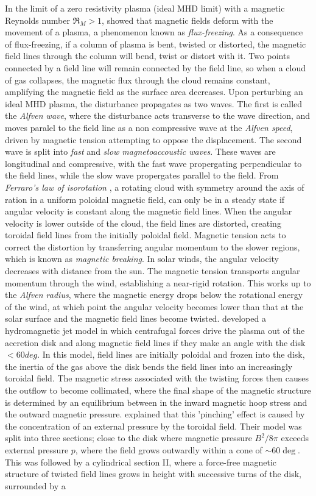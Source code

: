 \documentclass[11pt]{article}
\begin{document}
In the limit of a zero resistivity plasma (ideal MHD limit) with a magnetic Reynolds number $\Re_{M}>1$, \cite{Alfven1942} showed that magnetic fields deform with the movement of a plasma, a phenomenon known as \emph{flux-freezing}. As a consequence of flux-freezing, if a column of plasma is bent, twisted or distorted, the magnetic field lines through the column will bend, twist or distort with it. Two points connected by a field line will remain connected by the field line, so when a cloud of gas collapses, the magnetic flux through the cloud remains constant, amplifying the magnetic field as the surface area decreases. Upon perturbing an ideal MHD plasma, the disturbance propagates as two waves. The first is called the \emph{Alfven wave}, where the disturbance acts transverse to the wave direction, and moves paralel to the field line as a non compressive wave at the \emph{Alfven speed}, driven by magnetic tension attempting to oppose the displacement. The second wave is split into \emph{fast} and \emph{slow magnetoaccoustic waves}. These waves are longitudinal and compressive, with the fast wave propergating perpendicular to the field lines, while the slow wave propergates parallel to the field. From \emph{Ferraro's law of isorotation} \citep{Ferraro1937}, a rotating cloud with symmetry around the axis of ration in a uniform poloidal magnetic field, can only be in a steady state if angular velocity is constant along the magnetic field lines. When the angular velocity is lower outside of the cloud, the field lines are distorted, creating toroidal field lines from the initially poloidal field. Magnetic tension acts to correct the distortion by transferring angular momentum to the slower regions, which is known as \emph{magnetic breaking}. In solar winds, the angular velocity decreases with distance from the sun. The magnetic tension transports angular momentum through the wind, establishing a near-rigid rotation. This works up to the \emph{Alfven radius}, where the magnetic energy drops below the rotational energy of the wind, at which point the angular velocity becomes lower than that at the solar surface and the magnetic field lines become twisted. \cite{Blandford1982} developed a hydromagnetic jet model in which centrafugal forces drive the plasma out of the accretion disk and along magnetic field lines if they make an angle with the disk $<60deg$. In this model, field lines are initially poloidal and frozen into the disk, the inertia of the gas above the disk bends the field lines into an increasingly toroidal field. The magnetic stress associated with the twisting forces then causes the outflow to become collimated, where the final shape of the magnetic structure is determined by an equilibrium between in the inward magnetic hoop stress and the outward magnetic pressure. \cite{Lynden-Bell1996} explained that this 'pinching' effect is caused by the concentration of an external pressure by the toroidal field. Their model was split into three sections; close to the disk where magnetic pressure $B^{2}/8\pi$ exceeds external pressure $p$, where the field grows outwardly within a cone of $\sim 60\deg$. This was followed by a cylindrical section II, where a force-free magnetic structure of twisted field lines  grows in height with successive turns of the disk, surrounded by a 
\end{document}
